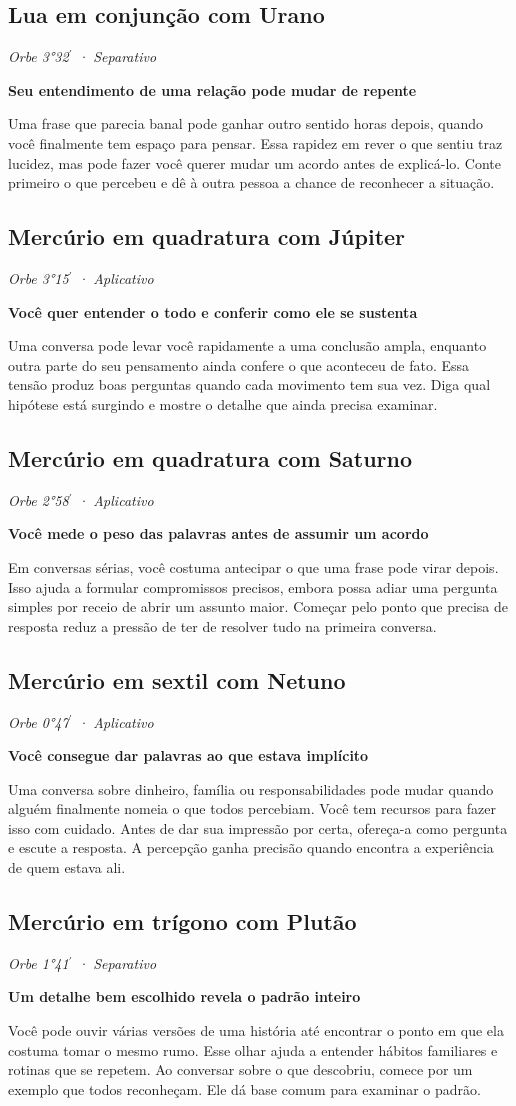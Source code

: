 \documentclass[11pt,a4paper]{article}
\newcommand{\leitura}[3]{\subsection{#1}\textit{#2}\par #3}
\newcommand{\subtituloleitura}[1]{\textbf{#1}\par\nopagebreak[4]}
\begin{document}
\leitura{Lua em conjunção com Urano}{Orbe 3°32\ensuremath{^{\prime}} · Separativo}{
\subtituloleitura{Seu entendimento de uma relação pode mudar de repente}
Uma frase que parecia banal pode ganhar outro sentido horas depois, quando você finalmente tem espaço para pensar. Essa rapidez em rever o que sentiu traz lucidez, mas pode fazer você querer mudar um acordo antes de explicá-lo. Conte primeiro o que percebeu e dê à outra pessoa a chance de reconhecer a situação.
}

\leitura{Mercúrio em quadratura com Júpiter}{Orbe 3°15\ensuremath{^{\prime}} · Aplicativo}{
\label{aspecto:mercurio-jupiter}\subtituloleitura{Você quer entender o todo e conferir como ele se sustenta}
Uma conversa pode levar você rapidamente a uma conclusão ampla, enquanto outra parte do seu pensamento ainda confere o que aconteceu de fato. Essa tensão produz boas perguntas quando cada movimento tem sua vez. Diga qual hipótese está surgindo e mostre o detalhe que ainda precisa examinar.
}

\leitura{Mercúrio em quadratura com Saturno}{Orbe 2°58\ensuremath{^{\prime}} · Aplicativo}{
\subtituloleitura{Você mede o peso das palavras antes de assumir um acordo}
Em conversas sérias, você costuma antecipar o que uma frase pode virar depois. Isso ajuda a formular compromissos precisos, embora possa adiar uma pergunta simples por receio de abrir um assunto maior. Começar pelo ponto que precisa de resposta reduz a pressão de ter de resolver tudo na primeira conversa.
}

\leitura{Mercúrio em sextil com Netuno}{Orbe 0°47\ensuremath{^{\prime}} · Aplicativo}{
\subtituloleitura{Você consegue dar palavras ao que estava implícito}
Uma conversa sobre dinheiro, família ou responsabilidades pode mudar quando alguém finalmente nomeia o que todos percebiam. Você tem recursos para fazer isso com cuidado. Antes de dar sua impressão por certa, ofereça-a como pergunta e escute a resposta. A percepção ganha precisão quando encontra a experiência de quem estava ali.
}

\leitura{Mercúrio em trígono com Plutão}{Orbe 1°41\ensuremath{^{\prime}} · Separativo}{
\label{aspecto:mercurio-plutao}\subtituloleitura{Um detalhe bem escolhido revela o padrão inteiro}
Você pode ouvir várias versões de uma história até encontrar o ponto em que ela costuma tomar o mesmo rumo. Esse olhar ajuda a entender hábitos familiares e rotinas que se repetem. Ao conversar sobre o que descobriu, comece por um exemplo que todos reconheçam. Ele dá base comum para examinar o padrão.
}
\end{document}
